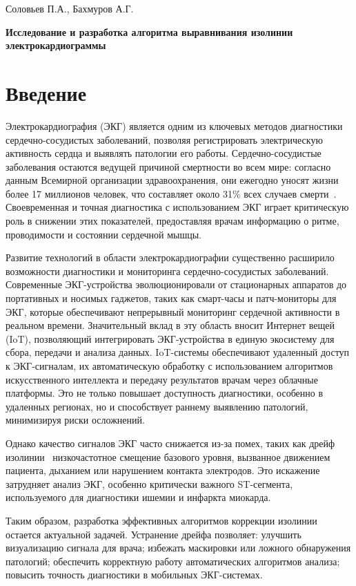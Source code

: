 \documentclass[10pt,a5paper]{article}
\numberwithin{figure}{section}
\numberwithin{table}{section}
\begin{document}
\begin{center}
\large
Соловьев П.А., Бахмуров А.Г.

{\bfseries\Large Исследование и разработка алгоритма выравнивания изолинии электрокардиограммы}
\end{center}

\section{Введение}
Электрокардиография (ЭКГ) является одним из ключевых методов диагностики сердечно-сосудистых заболеваний, позволяя регистрировать электрическую активность сердца и выявлять патологии его работы. Сердечно-сосудистые заболевания остаются ведущей причиной смертности во всем мире: согласно данным Всемирной организации здравоохранения, они ежегодно уносят жизни более 17 миллионов человек, что составляет около 31\% всех случаев смерти~\cite{worldhealth}. Своевременная и точная диагностика с использованием ЭКГ играет критическую роль в снижении этих показателей, предоставляя врачам информацию о ритме, проводимости и состоянии сердечной мышцы.

Развитие технологий в области электрокардиографии существенно расширило возможности диагностики и мониторинга сердечно-сосудистых заболеваний. Современные ЭКГ-устройства эволюционировали от стационарных аппаратов до портативных и носимых гаджетов, таких как смарт-часы и патч-мониторы для ЭКГ, которые обеспечивают непрерывный мониторинг сердечной активности в реальном времени. Значительный вклад в эту область вносит Интернет вещей (IoT), позволяющий интегрировать ЭКГ-устройства в единую экосистему для сбора, передачи и анализа данных. IoT-системы обеспечивают удаленный доступ к ЭКГ-сигналам, их автоматическую обработку с использованием алгоритмов искусственного интеллекта и передачу результатов врачам через облачные платформы. Это не только повышает доступность диагностики, особенно в удаленных регионах, но и способствует раннему выявлению патологий, минимизируя риски осложнений.

Однако качество сигналов ЭКГ часто снижается из-за помех, таких как дрейф изолинии \textendash\ низкочастотное смещение базового уровня, вызванное движением пациента, дыханием или нарушением контакта электродов. Это искажение затрудняет анализ ЭКГ, особенно критически важного ST-сегмента, используемого для диагностики ишемии и инфаркта миокарда.

Таким образом, разработка эффективных алгоритмов коррекции изолинии остается актуальной задачей. Устранение дрейфа позволяет: улучшить визуализацию сигнала для врача; избежать маскировки или ложного обнаружения патологий; обеспечить корректную работу автоматических алгоритмов анализа; повысить точность диагностики в мобильных ЭКГ-системах.
\end{document}
